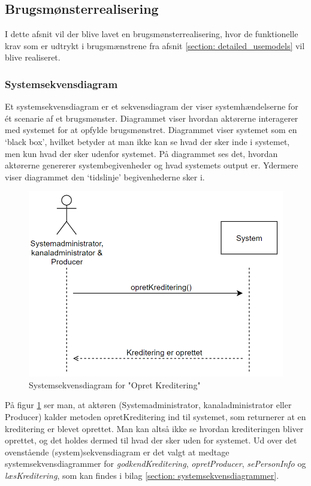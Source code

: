 \subsection{Brugsmønsterrealisering}
I dette afsnit vil der blive lavet en brugsmønsterrealisering, hvor de funktionelle krav som er udtrykt i brugsmænstrene fra afsnit \ref{section: detailed_usemodels} vil blive realiseret.


\subsubsection{Systemsekvensdiagram}
Et systemsekvensdiagram er et sekvensdiagram der viser systemhændelserne for ét scenarie af et brugsmønster. Diagrammet viser hvordan aktørerne interagerer med systemet for at opfylde brugsmønstret. Diagrammet viser systemet som en ‘black box’, hvilket betyder at man ikke kan se
hvad der sker inde i systemet, men kun hvad der sker udenfor systemet. På diagrammet ses det, hvordan aktørerne genererer systembegivenheder og hvad systemets output er. Ydermere viser diagrammet den ‘tidslinje’ begivenhederne sker i. \\

\begin{figure}[H]
\centering
\includegraphics[scale=0.5]{figures/systemsekvensdiagrammer/opretKreditering.PNG}
\caption{Systemsekvensdiagram for "Opret Kreditering"}
\label{fig:systemsekvensdiagram_opretKreditering}
\end{figure}

\noindent
På figur \ref{fig:systemsekvensdiagram_opretKreditering} ser man, at aktøren (Systemadministrator, kanaladministrator eller Producer) kalder metoden opretKreditering ind til systemet, som returnerer at en kreditering er blevet oprettet. Man kan altså ikke se hvordan krediteringen bliver oprettet, og det holdes dermed til hvad der sker uden for systemet. Ud over det ovenstående (system)sekvensdiagram er det valgt at medtage systemsekvensdiagrammer for \textit{godkendKreditering}, \textit{opretProducer}, \textit{sePersonInfo} og \textit{læsKreditering}, som kan findes i bilag \ref{section: systemsekvensdiagrammer}. \\

